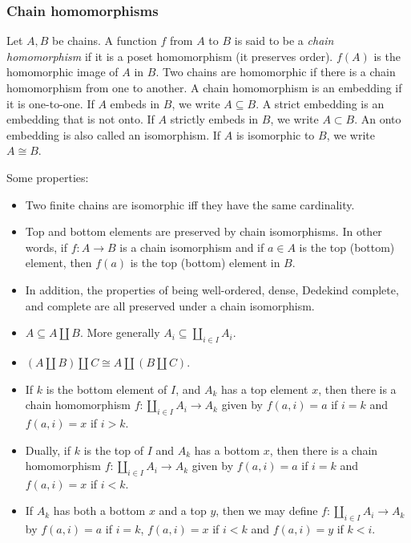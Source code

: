 \documentclass[12pt]{article}
\begin{document}
\subsubsection*{Chain homomorphisms}

Let $A,B$ be chains.  A function $f$ from $A$ to $B$ is said to be a \emph{chain homomorphism} if it is a poset homomorphism (it preserves order).  $f(A)$ is the homomorphic image of $A$ in $B$.  Two chains are homomorphic if there is a chain homomorphism from one to another.  A chain homomorphism is an embedding if it is one-to-one.  If $A$ embeds in $B$, we write $A\subseteq B$.  A strict embedding is an embedding that is not onto.  If $A$ strictly embeds in $B$, we write $A\subset B$.  An onto embedding is also called an isomorphism.  If $A$ is isomorphic to $B$, we write $A\cong B$.

Some properties:
\begin{itemize}
\item Two finite chains are isomorphic iff they have the same cardinality.
\item Top and bottom elements are preserved by chain isomorphisms.  In other words, if $f:A\to B$ is a chain isomorphism and if $a\in A$ is the top (bottom) element, then $f(a)$ is the top (bottom) element in $B$.
\item In addition, the properties of being well-ordered, dense, Dedekind complete, and complete are all preserved under a chain isomorphism.
\item $A\subseteq A\coprod B$.  More generally $A_i\subseteq \coprod_{i\in I} A_i$.
\item $(A\coprod B)\coprod C\cong A\coprod (B\coprod C)$.
\item If $k$ is the bottom element of $I$, and $A_k$ has a top element $x$, then there is a chain homomorphism $f:\coprod_{i\in I} A_i\to A_k$ given by $f(a,i)=a$ if $i=k$ and $f(a,i)=x$ if $i>k$.
\item Dually, if $k$ is the top of $I$ and $A_k$ has a bottom $x$, then there is a chain homomorphism $f:\coprod_{i\in I} A_i\to A_k$ given by $f(a,i)=a$ if $i=k$ and $f(a,i)=x$ if $i<k$.
\item If $A_k$ has both a bottom $x$ and a top $y$, then we may define $f:\coprod_{i\in I} A_i\to A_k$ by $f(a,i)=a$ if $i=k$, $f(a,i)=x$ if $i<k$ and $f(a,i)=y$ if $k<i$.
\end{itemize}
\end{document}
